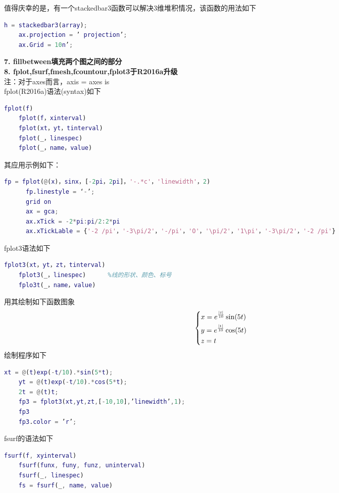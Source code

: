     值得庆幸的是，有一个stackedbar3函数可以解决3维堆积情况，该函数的用法如下
    \begin{lstlisting}[language = Matlab]
    h = stackedbar3(array);
    ax.projection = ’ projection’;
    ax.Grid = 10n’;
    \end{lstlisting}
    \textbf{7. fillbetween填充两个图之间的部分}\\
    \textbf{8. fplot,fsurf,fmesh,fcountour,fplot3于R2016a升级}\\
    注：对于axes而言，axis = axes is\\
    fplot(R2016a)语法(syntax)如下
    \begin{lstlisting}[language = Matlab]
    fplot(f)
    fplot(f，xinterval)
    fplot(xt，yt，tinterval)
    fplot(_，linespec)
    fplot(_，name，value)
    \end{lstlisting}
    其应用示例如下：
    \begin{lstlisting}[language=Matlab]
      fp = fplot(@(x)，sinx，[-2pi，2pi]，'-.*c'，'linewidth'，2)
      fp.linestyle = ‘-’;
      grid on
      ax = gca;
      ax.xTick = -2*pi:pi/2:2*pi
      ax.xTickLable = {'-2 /pi'，'-3\pi/2'，'-/pi'，'O'，'\pi/2'，'1\pi'，'-3\pi/2'，'-2 /pi'}
    \end{lstlisting}
    fplot3语法如下
    \begin{lstlisting}[language = Matlab]
    fplot3(xt，yt，zt，tinterval)
    fplot3(_，linespec)      %线的形状、颜色、标号
    fplo3t(_，name，value)
    \end{lstlisting}
    \par
    用其绘制如下函数图象
    \begin{equation*}
    \centering
    \left\{\begin{lgathered}
    x=e^{\frac {|t|}{10}}\sin(5t)\\
    y=e^{\frac {|t|}{10}}\cos(5t)\\
    z=t
    \end{lgathered} \right.
    \end{equation*}
    绘制程序如下
    \begin{lstlisting}[language=Matlab]
    xt = @(t)exp(-t/10).*sin(5*t);
    yt = @(t)exp(-t/10).*cos(5*t);
    2t = @(t)t;
    fp3 = fplot3(xt,yt,zt,[-10,10],’linewidth’,1);
    fp3
    fp3.color = ’r’;
    \end{lstlisting}
    fsurf的语法如下
    \begin{lstlisting}[language = Matlab]
    fsurf(f, xyinterval)
    fsurf(funx, funy, funz, uninterval)
    fsurf(_, linespec)
    fs = fsurf(_, name, value)
    \end{lstlisting}
